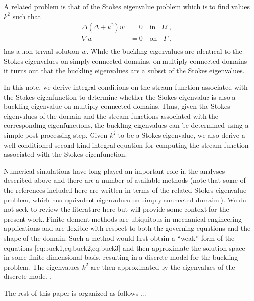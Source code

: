 A related problem is that of the Stokes eigenvalue problem
which is to find values $k^2$ such that
\begin{align}
\Delta (\Delta + k^2) w &= 0 \quad \textrm{in} \quad \Omega \label{eq:stokes1} \; , \\
\nabla w &= 0 \quad \textrm{on} \quad \Gamma \label{eq:stokes2} \; ,\\
\end{align}
has a non-trivial solution $w$.
While the buckling eigenvalues are identical to the Stokes
eigenvalues on simply connected domains, on multiply
connected domains it turns out that the buckling eigenvalues
are a subset of the Stokes eigenvalues.

In this note, we derive integral conditions on the stream function 
associated with the Stokes eigenfunction
to determine whether the Stokes eigenvalue is also a 
buckling eigenvalue on multiply connected domains.
Thus, given the Stokes eigenvalues 
of the domain and the stream functions associated with the 
corresponding eigenfunctions, 
the buckling eigenvalues can be determined using a simple
post-processing step.
Given $k^2$ to be a Stokes eigenvalue, we also derive
a well-conditioned second-kind integral equation for computing 
the stream function associated with the 
Stokes eigenfunction. 


Numerical simulations have long played an important
role in the analyses described above and there are a number
of available methods (note that some of the references
included here are written in terms of the related
Stokes eigenvalue problem, which has equivalent
eigenvalues on simply connected domains). We do not
seek to review the literature here but will provide
some context for the present work. Finite element methods
are ubiquitous in mechanical engineering applications
and are flexible with respect to both the governing
equations and the shape of the domain. Such a method
would first obtain a ``weak'' form of the equations
\cref{eq:buck1,eq:buck2,eq:buck3} and then 
approximate the solution space in some
finite dimensional basis, resulting in a discrete model
for the buckling problem.
The eigenvalues $k^2$ are then
approximated by the eigenvalues of the discrete
model \cite{johnson1974beam,rannacher1979nonconforming,
  jia2009approximation,carstensen2014guaranteed}.


The rest of this paper is organized as follows ...

